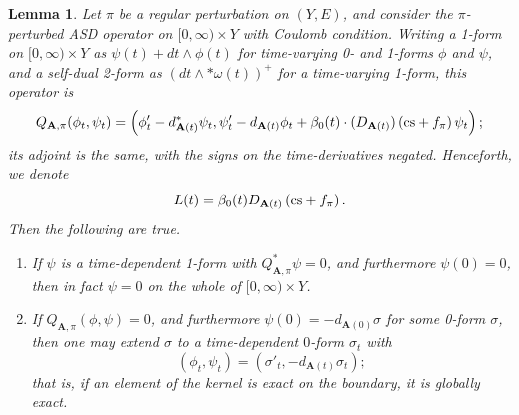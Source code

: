 \documentclass{memo-l}
\newtheorem{lemma}[theorem]{Lemma}
\theoremstyle{definition}
\theoremstyle{remark}
\numberwithin{section}{chapter}
\numberwithin{equation}{chapter}
\begin{document}
\begin{lemma}\label{ker-end}Let $\pi$ be a regular perturbation on $(Y, E)$, and consider the $\pi$-perturbed ASD operator on $[0,\infty) \times Y$ with Coulomb condition. 
Writing a 1-form on $[0,\infty) \times Y$ as $\psi(t) + dt \wedge \phi(t)$ for time-varying 0- and 1-forms $\phi$ and $\psi$, and a self-dual 2-form as $(dt \wedge *\omega(t))^+$ for a time-varying 1-form, this operator is
$$Q_{\mathbf{A},\pi}(\phi_t, \psi_t) = \left(\phi'_t - d_{\mathbf{A}(t)}^* \psi_t, \psi'_t - d_{\mathbf{A}(t)} \phi_t + \beta_0(t) \cdot (D_{\mathbf{A}(t)})\left(\textup{cs}+f_\pi\right)\psi_t\right);$$ 
its adjoint is the same, with the signs on the time-derivatives negated. Henceforth, we denote $$L(t) = \beta_0(t) D_{\mathbf{A}(t)}\left(\textup{cs}+f_\pi\right).$$
Then the following are true.
\begin{enumerate}
\item If $\psi$ is a time-dependent 1-form with $Q^*_{\mathbf{A},\pi}\psi = 0$, and furthermore $\psi(0) = 0$, then in fact $\psi = 0$ on the whole of $[0,\infty) \times Y$. 
\item If $Q_{\mathbf{A},\pi}(\phi, \psi) = 0$, and furthermore $\psi(0) = -d_{\mathbf{A}(0)} \sigma$ for some 0-form $\sigma$, then one may extend $\sigma$ to a time-dependent $0$-form $\sigma_t$ with 
$$(\phi_t, \psi_t) = (\sigma'_t, -d_{\mathbf{A}(t)} \sigma_t);$$ 
that is, if an element of the kernel is exact on the boundary, it is globally exact.
\end{enumerate}
\end{lemma}
\end{document}
